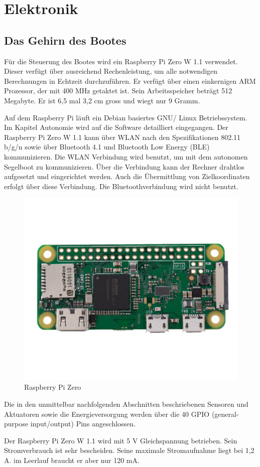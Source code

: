 

\chapter{Elektronik}
\label{chap:elektronik}
\section{Das Gehirn des Bootes}
Für die Steuerung des Bootes wird ein Raspberry Pi Zero W 1.1 verwendet. Dieser verfügt über ausreichend Rechenleistung, um alle notwendigen Berechnungen in Echtzeit durchzuführen. Er verfügt über einen einkernigen ARM Prozessor, der mit 400 MHz getaktet ist. Sein Arbeitsspeicher beträgt 512 Megabyte. Er ist 6,5 mal 3,2 cm gross und wiegt nur 9 Gramm.

Auf dem Raspberry Pi läuft ein Debian basiertes GNU/ Linux Betriebssystem. Im Kapitel Autonomie wird auf die Software detailliert eingegangen. 
Der Raspberry Pi Zero W 1.1 kann über WLAN nach den Spezifikationen 802.11 b/g/n sowie über Bluetooth 4.1 und Bluetooth Low Energy (BLE) kommunizieren. Die WLAN Verbindung wird benutzt, um mit dem autonomen Segelboot zu kommunizieren. Über die Verbindung kann der Rechner drahtlos aufgesetzt und eingerichtet werden. Auch die Übermittlung von Zielkoordinaten erfolgt über diese Verbindung. Die Bluetoothverbindung wird nicht benutzt.
\begin{figure}
    \centering
    \includegraphics[width=0.5\linewidth]{assets/raspi Zero.jpg}
    \caption{Raspberry Pi Zero }
    \label{fig:enter-label}
\end{figure}

Die in den unmittelbar nachfolgenden Abschnitten beschriebenen Sensoren und Aktuatoren sowie die Energieversorgung werden über die 40 GPIO (general-purpose input/output) Pins angeschlossen. 

Der Raspberry Pi Zero W 1.1 wird mit 5 V Gleichspannung betrieben. Sein Stromverbrauch ist sehr bescheiden. Seine maximale Stromaufnahme liegt bei 1,2 A.
\cite{noauthor_raspberry_2023} im Leerlauf braucht er aber nur 120 mA.
\cite{noauthor_stromverbrauch_nodate}
